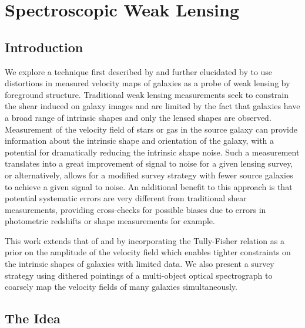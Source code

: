\chapter{Spectroscopic Weak Lensing}

\label{chap:speclens}

  
 

\section{Introduction}

We explore a technique first described by \citet{Blain2002} and
further elucidated by \citet{Morales2006} to use distortions in
measured velocity maps of galaxies as a probe of weak lensing by
foreground structure. Traditional weak lensing measurements seek to
constrain the shear induced on galaxy images and are limited by the
fact that galaxies have a broad range of intrinsic shapes and only the
lensed shapes are observed. Measurement of the velocity field of stars
or gas in the source galaxy can provide information about the
intrinsic shape and orientation of the galaxy, with a potential for
dramatically reducing the intrinsic shape noise. Such a measurement
translates into a great improvement of signal to noise for a given
lensing survey, or alternatively, allows for a modified survey
strategy with fewer source galaxies to achieve a given signal to
noise. An additional benefit to this approach is that potential
systematic errors are very different from traditional shear
measurements, providing cross-checks for possible biases due to errors
in photometric redshifts or shape measurements for example.

This work extends that of \citet{Blain2002} and \citet{Morales2006} by
incorporating the Tully-Fisher \citep{Tully1977} relation as a prior
on the amplitude of the velocity field which enables tighter
constraints on the intrinsic shapes of galaxies with limited data. We
also present a survey strategy using dithered pointings of a
multi-object optical spectrograph to coarsely map the velocity fields
of many galaxies simultaneously.

\section{The Idea}

